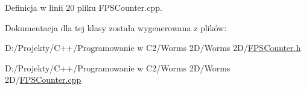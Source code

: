 Definicja w linii 20 pliku F\+P\+S\+Counter.\+cpp.



Dokumentacja dla tej klasy została wygenerowana z plików\+:\begin{DoxyCompactItemize}
\item 
D\+:/\+Projekty/\+C++/\+Programowanie w C2/\+Worms 2\+D/\+Worms 2\+D/\mbox{\hyperlink{_f_p_s_counter_8h}{F\+P\+S\+Counter.\+h}}\item 
D\+:/\+Projekty/\+C++/\+Programowanie w C2/\+Worms 2\+D/\+Worms 2\+D/\mbox{\hyperlink{_f_p_s_counter_8cpp}{F\+P\+S\+Counter.\+cpp}}\end{DoxyCompactItemize}
